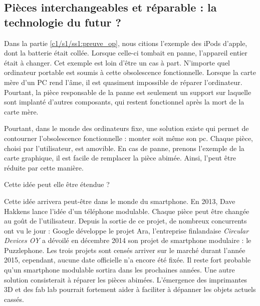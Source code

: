 \subsection{Pièces interchangeables et réparable : la technologie du futur ? }

Dans la partie \ref{c1/s1/ss1:preuve_op}, nous citions l'exemple des iPods d'apple, dont la batterie était collée. Lorsque celle-ci tombait en panne,  l'appareil entier était à changer. 
Cet exemple est loin d'être un cas à part. N'importe quel ordinateur portable est soumis à cette obsolescence fonctionnelle. Lorsque la carte mère d'un PC rend l'âme, il est quasiment impossible de réparer l'ordinateur. Pourtant, la pièce responsable de la panne est seulement un support sur laquelle sont implanté d'autres composants, qui restent fonctionnel après la mort de la carte mère.  

Pourtant, dans le monde des ordinateurs fixe, une solution existe qui permet de contourner l'obsolescence fonctionnelle : monter soit même son pc. Chaque pièce, choisi par l'utilisateur, est amovible. En cas de panne, prenons l'exemple de la carte graphique, il est facile de remplacer la pièce abimée. Ainsi, l'\op peut être réduite par cette manière. 


Cette idée peut elle être étendue ? 

\bigbreak

Cette idée arrivera peut-être dans le monde du smartphone. En 2013, Dave Hakkens lance l'idée d'un téléphone modulable. Chaque pièce peut être changée au goût de l'utilisateur. Depuis la sortie de ce projet, de nombreux concurrents ont vu le jour : Google développe le projet Ara,  l'entreprise finlandaise \textit{Circular Devices OY} a dévoilé en décembre 2014 son projet de smartphone modulaire : le Puzzlephone. Les trois projets sont censés arriver sur le marché durant l'année 2015, cependant, aucune date officielle n'a encore été fixée. Il reste fort probable qu'un smartphone modulable sortira dans les prochaines années. 
\medbreak
Une autre solution consisterait à réparer les pièces abimées.  L'émergence des imprimantes 3D et des fab lab pourrait fortement aider  à faciliter à dépanner les objets actuels cassés. 

